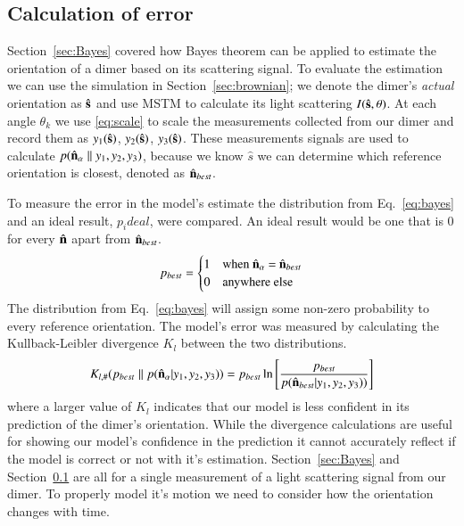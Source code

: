 \documentclass[final,  3p]{elsarticle}
\begin{document}
\subsection{Calculation of error}
\label{sec:divergence}
Section~\ref{sec:Bayes} covered how Bayes theorem can be applied to estimate
the orientation of a dimer based on its scattering signal. To evaluate the estimation we can use the simulation in Section~\ref{sec:brownian}; we denote the dimer's \emph{actual} orientation as $\hat{\bf s}$ and use MSTM to calculate its light scattering $I(\hat{\bf s}, \theta)$. At each angle $\theta_k$ we use \eqref{eq:scale} to scale the measurements collected from our dimer and record them as $y_1(\hat{\bf s})$, $y_2(\hat{\bf s})$, $y_3(\hat{\bf s})$. These measurements signals are used to calculate $p(\hat{\bf n}_{\alpha}\parallel y_1, y_2, y_3)$, because we know $\hat{s}$ we can determine which reference orientation is closest, denoted as $\hat{\bf n}_{best}$.

To measure the error in the model's estimate the distribution from
Eq.~\eqref{eq:bayes} and an ideal result, $p_ideal$, were compared.  An ideal result would be one that is 0 for every $\hat{\bf n}$ apart from $\hat{\bf n}_{best}$.
\begin{align}
	\label{eq:best}
	p_{best} = 
	\begin{cases}
		1 & \text{when $\hat{\bf n}_\alpha$ = $\hat{\bf n}_{best}$}\\
		0 & \text{anywhere else}
	\end{cases}
\end{align}
The distribution from Eq.~\eqref{eq:bayes} will assign some non-zero
probability to every reference orientation. The model's error was measured by calculating the Kullback-Leibler divergence $K_l$ between the two distributions.
\begin{align}
	K_{l, \#}(p_{best}\parallel p(\hat{\bf n}_\alpha| y_1, y_2, y_3))
	= p_{best}\ln \left[\frac{p_{best}}{p(\hat{\bf n}_{best}| y_1,y_2,y_3))}
	\right]
	\label{eq;kullback}
\end{align}
where a larger value of $K_l$ indicates that our model is less confident in its prediction of the dimer's orientation. While the divergence calculations are useful for showing our model's confidence in the prediction it cannot accurately reflect if the model is correct or not with it's estimation. 
Section~\ref{sec:Bayes} and Section~\ref{sec:divergence} are all for a single measurement of a light scattering signal from our dimer. To properly model it's motion we need to consider how the orientation changes with time. 
\end{document}
